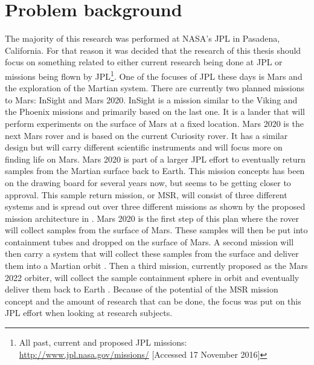 \chapter{Problem background}

\label{ch:problembackground}
The majority of this research was performed at NASA's \ac{JPL} in Pasadena, California. For that reason it was decided that the research of this thesis should focus on something related to either current research being done at \ac{JPL} or missions being flown by \ac{JPL}\footnote{All past, current and proposed \ac{JPL} missions: \url{http://www.jpl.nasa.gov/missions/} [Accessed 17 November 2016]}.   One of the focuses of \ac{JPL} these days is Mars and the exploration of the Martian system. There are currently two planned missions to Mars: InSight and Mars 2020. InSight is a mission similar to the Viking and the Phoenix missions and primarily based on the last one. It is a lander that will perform experiments on the surface of Mars at a fixed location. Mars 2020 is the next Mars rover and is based on the current Curiosity rover. It has a similar design but will carry different scientific instruments and will focus more on finding life on Mars. Mars 2020 is part of a larger \ac{JPL} effort to eventually return samples from the Martian surface back to Earth. This mission concepts has been on the drawing board for several years now, but seems to be getting closer to approval. This sample return mission, or \ac{MSR}, will consist of three different systems and is spread out over three different missions as shown by the proposed mission architecture in . Mars 2020 is the first step of this plan where the rover will collect samples from the surface of Mars. These samples will then be put into containment tubes and dropped on the surface of Mars. A second mission will then carry a system that will collect these samples from the surface and deliver them into a Martian orbit \citep{shotwell2016drivers}. Then a third mission, currently proposed as the Mars 2022 orbiter, will collect the sample containment sphere in orbit and eventually deliver them back to Earth \citep{woolley2011mars}. Because of the potential of the \ac{MSR} mission concept and the amount of research that can be done, the focus was put on this \ac{JPL} effort when looking at research subjects.


